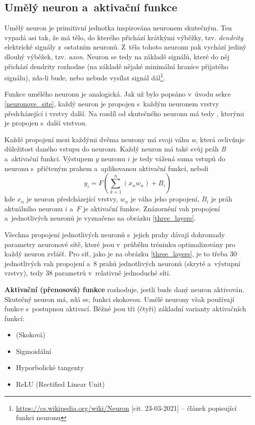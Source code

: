 \subsection{Umělý neuron a~aktivační funkce}
Umělý neuron je primitivní jednotka inspirována neuronem skutečným. Ten vypadá asi tak, že má tělo, do kterého přichází krátkými výběžky, tzv. \emph{dendrity} elektrické signály z~ostatním neuronů. Z~těla tohoto neuronu pak vychází jediný dlouhý výběžek, tzv. \emph{axon}. Neuron se tedy na základě signálů, které do něj přichází dendrity rozhodne (na základě nějaké minimální hranice přijatého signálu), zda-li bude, nebo nebude vysílat signál dál\footnote{\url{https://cs.wikipedia.org/wiki/Neuron} [cit. 23-03-2021] -- článek popisující funkci neuronu}.\par
Funkce umělého neuronu je analogická. Jak už bylo popsáno v~úvodu sekce \ref{neuronove_site}, každý neuron je propojen s~každým neuronem vrstvy předcházející i vrstvy další. Na rozdíl od skutečného neuronu má tedy , kterými je propojen s~další vrstvou.\par
Každé propojení mezi každými dvěma neurony má svoji váhu \emph{w}, která ovlivňuje důležitost daného vstupu do neuronu. Každý neuron má také svůj práh \emph{B} a~aktivační funkci. Výstupem $y$ neuronu $i$ je tedy vážená suma vstupů do neuronu s~přičteným prahem a~aplikovanou aktivační funkcí, neboli 
\begin{equation}
y_i = F({\sum_{k=1}^n ({x_n}w_n)} + B_i)
\end{equation}
kde $x_n$ je neuron předcházející vrstvy, $w_n$ je váha jeho propojení, $B_i$ je práh aktuálního neuronu $i$ a~$F$ je aktivační funkce. Znázornění vah propojení a~jednotlivých neuronů je vyznačeno na obrázku \ref{three_layers}.\par
Všechna propojení jednotlivých neuronů s~jejich prahy dávají dohromady parametry neuronové sítě, které jsou v~průběhu tréninku optimalizovány pro každý neuron zvlášť. Pro síť, jako je na obrázku \ref{three_layers}, je to třeba 30 jednotlivých vah propojení a~8 prahů jednotlivých neuronů (skryté a~výstupní vrstvy), tedy 38 parametrů v~relativně jednoduché síti.\par
\textbf{Aktivační (přenosová) funkce} rozhoduje, jestli bude daný neuron aktivován. Skutečný neuron má, zdá se, funkci skokovou. Umělé neurony však používají funkce s~postupnou aktivací. Běžné jsou tři (čtyři) základní varianty aktivačních funkcí: 

\begin{itemize}
    \item (Skoková)
    \item Sigmoidální
    \item Hyporbolické tangenty
    \item ReLU (Rectified Linear Unit)
\end{itemize}

